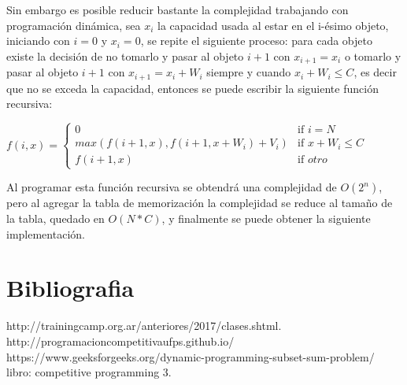 \documentclass[12pt, a4paper]{article}
\newcommand\cppfile[2][]{

}
\begin{document}
	Sin embargo es posible reducir bastante la complejidad trabajando con programación dinámica, sea $x_{i}$ la 
	capacidad usada al estar en el i-ésimo objeto, iniciando con $i=0$ y $x_{i}=0$, se repite el siguiente proceso: 
	para cada objeto existe la decisión de no tomarlo y pasar al objeto $i+1$ con $x_{i+1}=x_{i}$ o tomarlo y pasar 
	al objeto $i+1$ con $x_{i+1}=x_{i}+W_{i}$ siempre y cuando $x_{i}+W_{i} \leq C$, es decir que no se exceda la 
	capacidad, entonces se puede escribir la siguiente función recursiva:
	\begin{center}
		$f(i, x) = 	
		\begin{cases}
			0 & \text{if } i = N\\
			max(f(i+1,x), f(i+1,x+W_{i}) + V_{i}) & \text{if } x+W_{i} \leq C \\
			f(i+1,x) & \text{if $otro$}
		\end{cases}
		$\\
	\end{center}
	
	Al programar esta función recursiva se obtendrá una complejidad de $O(2^{n})$, pero al agregar la tabla de 
	memorización la complejidad se reduce al tamaño de la tabla, quedado en $O(N*C)$, y finalmente se puede obtener 
	la siguiente implementación.
	\cppfile[9-17]{Programacion_dinamica/codigos/ProblemaMochila.cpp}
	
	
	
	\section{Bibliografia}
	
	http://trainingcamp.org.ar/anteriores/2017/clases.shtml.\\
	http://programacioncompetitivaufps.github.io/\\
	https://www.geeksforgeeks.org/dynamic-programming-subset-sum-problem/\\
	libro: competitive programming 3.\\

	
\end{document}
